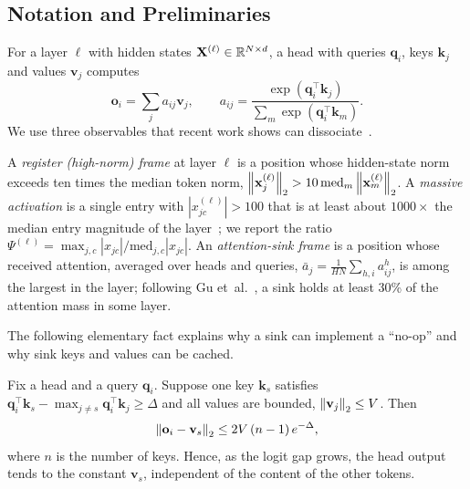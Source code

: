 \subsection{Notation and Preliminaries}

For a layer $\ell$ with hidden states $\mathbf{X}^{(\ell)}\in\mathbb{R}^{N\times d}$, a head with queries $\mathbf{q}_i$, keys $\mathbf{k}_j$ and values $\mathbf{v}_j$ computes
\begin{equation}
    \mathbf{o}_i = \sum_{j} a_{ij}\mathbf{v}_j,\qquad
    a_{ij}=\frac{\exp(\mathbf{q}_i^\top\mathbf{k}_j)}{\sum_{m}\exp(\mathbf{q}_i^\top\mathbf{k}_m)}.
    \label{eq:loss}
\end{equation}
We use three observables that recent work shows can dissociate~\cite{sun2026anatomy,ngnawe2026spike}.

\begin{definition}
A \emph{register (high-norm) frame} at layer $\ell$ is a position whose hidden-state norm exceeds ten times the median token norm, $\left\lVert \mathbf{x}^{(\ell)}_j \right\rVert_2>10\,\mathrm{med}_m\left\lVert \mathbf{x}^{(\ell)}_m \right\rVert_2$. A \emph{massive activation} is a single entry with $|x^{(\ell)}_{jc}|>100$ that is at least about $1000\times$ the median entry magnitude of the layer~\cite{sun2024massive}; we report the ratio $\Psi^{(\ell)}=\max_{j,c}|x_{jc}|/\mathrm{med}_{j,c}|x_{jc}|$. An \emph{attention-sink frame} is a position whose received attention, averaged over heads and queries, $\bar a_j=\frac{1}{HN}\sum_{h,i}a^{h}_{ij}$, is among the largest in the layer; following Gu et~al.~\cite{gu2025sinkemerges}, a sink holds at least 30\% of the attention mass in some layer.
\end{definition}

The following elementary fact explains why a sink can implement a ``no-op'' and why sink keys and values can be cached.

\begin{proposition}
\label{prop:placeholder}
Fix a head and a query $\mathbf{q}_i$. Suppose one key $\mathbf{k}_s$ satisfies $\mathbf{q}_i^\top\mathbf{k}_s-\max_{j\neq s}\mathbf{q}_i^\top\mathbf{k}_j\ge\Delta$ and all values are bounded, $\left\lVert \mathbf{v}_j \right\rVert_2\le V$. Then
\begin{equation}
    \left\lVert \mathbf{o}_i-\mathbf{v}_s \right\rVert_2 \le 2V\,(n-1)\,e^{-\Delta},
    \label{eq:placeholder-bound}
\end{equation}
where $n$ is the number of keys. Hence, as the logit gap grows, the head output tends to the constant $\mathbf{v}_s$, independent of the content of the other tokens.
\end{proposition}

